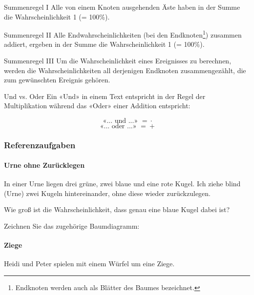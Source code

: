 \leserluft\leserluft
\begin{gesetz}{Summenregel I}{}
Alle von einem Knoten ausgehenden Äste haben in der Summe die Wahrscheinlichkeit 1 (= 100\%).
\end{gesetz}

\begin{gesetz}{Summenregel II}{}
Alle Endwahrscheinlichkeiten (bei den Endknoten\footnote{Endknoten werden auch als Blätter des Baumes bezeichnet.}) zusammen addiert, ergeben in der Summe die Wahrscheinlichkeit 1 (= 100\%).
\end{gesetz}

\begin{gesetz}{Summenregel III}{}
  Um die Wahrscheinlichkeit eines Ereignisses zu berechnen, werden die
  Wahrscheinlichkeiten all derjenigen Endknoten zusammengezählt, die zum gewünschten Ereignis gehören.
\end{gesetz}


\begin{bemerkung}{Und vs. Oder}{}
  Ein «Und» in einem Text entspricht in der Regel der Multiplikation
  während das «Oder» einer Addition entspricht:

  $$\text{ «... und ...» } \stackrel{{}^{}}{=}  \cdot{}$$
  $$\text{ «... oder ...» } \stackrel{{}^{}}{=}  +$$
\end{bemerkung}
\newpage


\subsubsection{Referenzaufgaben}

\paragraph{Urne ohne Zurücklegen} In einer Urne liegen drei grüne, zwei blaue und eine rote Kugel. Ich ziehe blind (Urne) zwei Kugeln hintereinander, ohne diese wieder zurückzulegen.

Wie groß ist die Wahrscheinlichkeit, dass genau eine blaue Kugel dabei ist?

Zeichnen Sie das zugehörige Baumdiagramm:


\paragraph{Ziege} Heidi und Peter spielen mit einem Würfel um eine Ziege.

